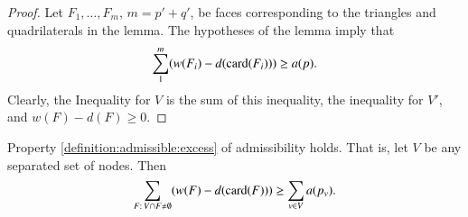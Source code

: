 \begin{proof}  Let $F_1,\ldots,F_m$, $m={p'+q'}$, be faces corresponding
to the triangles and quadrilaterals in the lemma.  The hypotheses
of the lemma imply that
    $$\sum_{1}^{m} (w(F_i) - d({\operatorname{card}}(F_i))) \ge a(p).$$
Clearly, the Inequality for $V$ is the sum of this inequality, the
inequality for $V'$, and $w(F)- d(F)\ge0$.
\end{proof}








\begin{lemma}  Property \ref{definition:admissible:excess}  of
admissibility holds.  That is, let $V$ be any separated set of
nodes. Then
        $$\sum_{F:\,V\cap F\ne\emptyset} (w(F) -d({\operatorname{card}}(F)))
            \ge \sum_{v\in V} a(p_v).$$
\end{lemma}

